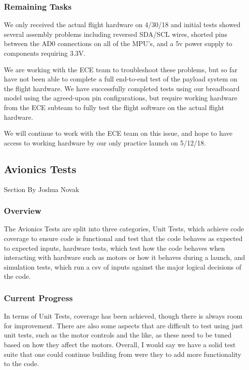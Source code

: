 \documentclass[onecolumn, draftclsnofoot, 10pt, compsoc]{IEEEtran}
\begin{document}
\subsubsection{Remaining Tasks}
We only received the actual flight hardware on 4/30/18 and initial tests showed several assembly problems including reversed SDA/SCL wires, shorted pins between the AD0 connections on all of the MPU's, and a 5v power supply to components requiring 3.3V.

We are working with the ECE team to troubleshoot these problems, but so far have not been able to complete a full end-to-end test of the payload system on the flight hardware.  We have successfully completed tests using our breadboard model using the agreed-upon pin configurations, but require working hardware from the ECE subteam to fully test the flight software on the actual flight hardware.

We will continue to work with the ECE team on this issue, and hope to have access to working hardware by our only practice launch on 5/12/18.

\subsection{Avionics Tests}
Section By Joshua Novak
\subsubsection{Overview}
The Avionics Tests are split into three categories, Unit Tests, which achieve code coverage to ensure code is functional and test that the code behaves as expected to expected inputs, hardware tests, which test how the code behaves when interacting with hardware such as motors or how it behaves during a launch, and simulation tests, which run a csv of inputs against the major logical decisions of the code.

\subsubsection{Current Progress}
In terms of Unit Tests, coverage has been achieved, though there is always room for improvement. There are also some aspects that are difficult to test using just unit tests, such as the motor controls and the like, as these need to be tuned based on how they affect the motors. Overall, I would say we have a solid test suite that one could continue building from were they to add more functionality to the code.
\end{document}
